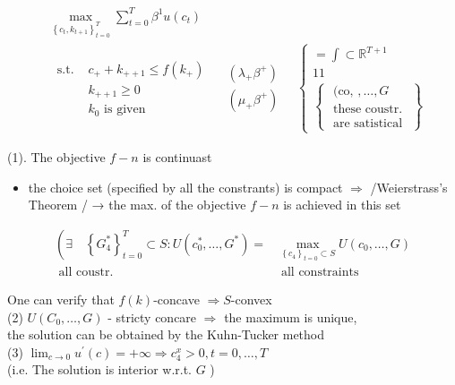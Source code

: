 \documentclass[10pt]{article}
\begin{document}
$$
\begin{aligned}
& \max _{\left\{c_{t}, k_{t+1}\right\}_{t=0}^{T}} \sum_{t=0}^{T} \beta^{1} u\left(c_{t}\right) \\
& \begin{array}{ll}
\text { s.t. } & c_{+}+k_{++1} \leqslant f\left(k_{+}\right) \\
& k_{++1} \geqslant 0 \\
& k_{0} \text { is given }
\end{array} \quad \begin{array}{c}
\left(\lambda_{+} \beta^{+}\right) \\
\left(\mu_{+} \beta^{+}\right)
\end{array} \quad\left\{\begin{array}{l}
=\int \subset \mathbb{R}^{T+1} \\
11 \\
\left\{\begin{array}{l}
\text { (co, }, \ldots, G \\
\text { these coustr. } \\
\text { are satistical }
\end{array}\right\}
\end{array}\right.
\end{aligned}
$$

(1). The objective $f-n$ is continuast

\begin{itemize}
  \item the choice set (specified by all the constrants) is compact $\Rightarrow$ /Weierstrass's Theorem / → the max. of the objective $f-n$ is achieved in this set
\end{itemize}

$$
\begin{aligned}
\left(\exists \quad\left\{G_{4}^{*}\right\}_{t=0}^{T} \subset S: U\left(c_{0}^{*}, \ldots, G^{*}\right)=\right. & \max _{\left\{c_{4}\right\}_{t=0} \subset S} U\left(c_{0}, \ldots, G\right) \\
\text { all coustr. } & \text { all constraints }
\end{aligned}
$$

One can verify that $f(k)$-concave $\Rightarrow S$-convex\\
(2) $U\left(C_{0}, \ldots, G\right)$ - stricty concare $\Rightarrow$ the maximum is unique,\\
the solution can be obtained by the Kuhn-Tucker method\\
(3) $\lim _{c \rightarrow 0} u^{\prime}(c)=+\infty \Rightarrow c_{4}^{x}>0, t=0, \ldots, T$\\
(i.e. The solution is interior w.r.t. $G$ )
\end{document}
